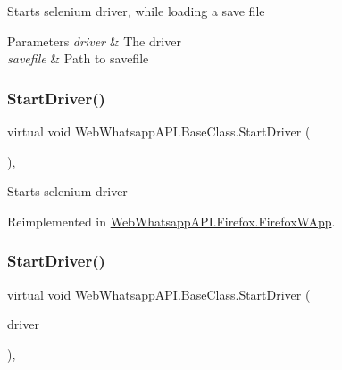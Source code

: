 Starts selenium driver, while loading a save file 


\begin{DoxyParams}{Parameters}
{\em driver} & The driver\\
\hline
{\em savefile} & Path to savefile\\
\hline
\end{DoxyParams}
\mbox{\label{class_web_whatsapp_a_p_i_1_1_base_class_a8108d46b4176fc74fb49626e8122df88}} 
\subsubsection{\texorpdfstring{Start\+Driver()}{StartDriver()}\hspace{0.1cm}{\footnotesize\ttfamily [2/3]}}
{\footnotesize\ttfamily virtual void Web\+Whatsapp\+A\+P\+I.\+Base\+Class.\+Start\+Driver (\begin{DoxyParamCaption}{ }\end{DoxyParamCaption})\hspace{0.3cm}{\ttfamily [inline]}, {\ttfamily [virtual]}}



Starts selenium driver 



Reimplemented in \hyperlink{class_web_whatsapp_a_p_i_1_1_firefox_1_1_firefox_w_app_a80f406639e59bc4152b8f255962607f2}{Web\+Whatsapp\+A\+P\+I.\+Firefox.\+Firefox\+W\+App}.

\mbox{\label{class_web_whatsapp_a_p_i_1_1_base_class_a3a26ad50a4ba508f1162402bc00e128b}} 
\subsubsection{\texorpdfstring{Start\+Driver()}{StartDriver()}\hspace{0.1cm}{\footnotesize\ttfamily [3/3]}}
{\footnotesize\ttfamily virtual void Web\+Whatsapp\+A\+P\+I.\+Base\+Class.\+Start\+Driver (\begin{DoxyParamCaption}\item[{I\+Web\+Driver}]{driver }\end{DoxyParamCaption})\hspace{0.3cm}{\ttfamily [inline]}, {\ttfamily [virtual]}}




